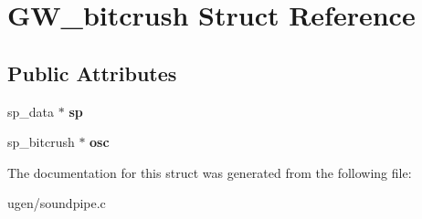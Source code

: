 \hypertarget{structGW__bitcrush}{}\section{G\+W\+\_\+bitcrush Struct Reference}
\label{structGW__bitcrush}
\subsection*{Public Attributes}
\begin{DoxyCompactItemize}
\item 
\hypertarget{structGW__bitcrush_abcbb218aefbd212c956e58ab881c7ce8}{}\label{structGW__bitcrush_abcbb218aefbd212c956e58ab881c7ce8} 
sp\+\_\+data $\ast$ {\bfseries sp}
\item 
\hypertarget{structGW__bitcrush_a05d9a1910bba83f2572fc7e1d68fccef}{}\label{structGW__bitcrush_a05d9a1910bba83f2572fc7e1d68fccef} 
sp\+\_\+bitcrush $\ast$ {\bfseries osc}
\end{DoxyCompactItemize}


The documentation for this struct was generated from the following file\+:\begin{DoxyCompactItemize}
\item 
ugen/soundpipe.\+c\end{DoxyCompactItemize}
